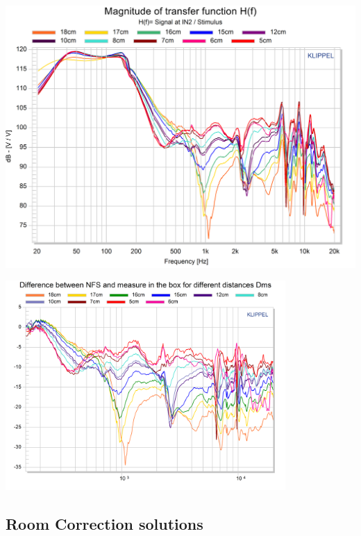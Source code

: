 \documentclass{report}
\begin{document}
\begin{appendices}
\begin{center}	
	\includegraphics[scale=0.76,angle=90]{RoomComp/MicPos_TRF} 
	\captionsetup{hypcap=false} 
	\label{fig:micpos_TRF_big}
\end{center}

\begin{center}
	\includegraphics[width=0.8\textwidth]{RoomComp/MicPos_Diff_NFS_TRF_zoom} 
    \captionsetup{hypcap=false} 
	\label{fig:MicPos_Diff_NFS_Zoom}
\end{center}


\subsection{Room Correction solutions}


\end{appendices}
\end{document}
